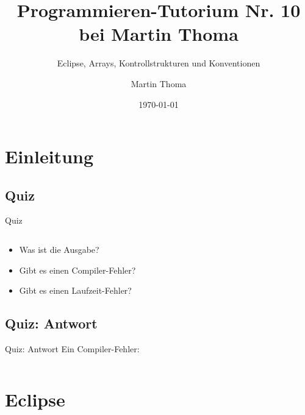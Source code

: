 \documentclass[usepdftitle=false,hyperref={pdfpagelabels=false}]{beamer}
\institute{Fakultät für Informatik}
\newcommand\tutor{Martin Thoma}
\newcommand\tutNR{10}
\newcommand\titleText{Programmieren-Tutorium Nr. \tutNR{} bei \tutor}
\newcommand\InsertToC[1][]{
  \begin{frame}{Outline}
    \tableofcontents[subsectionstyle=show/show/show, subsubsectionstyle=show/show/show, #1]
  \end{frame}
}
\begin{document}
\title{\titleText}
\subtitle{Eclipse, Arrays, Kontrollstrukturen und Konventionen}
\author{\tutor}
\date{\today}
\subject{Programmieren}

\frame{\titlepage}



\section{Einleitung}
\subsection{Quiz}
\begin{frame}{Quiz}
    \inputminted[linenos=true, numbersep=5pt, tabsize=4, fontsize=\small]{java}{Quiz.java}
    \begin{itemize}
        \item Was ist die Ausgabe?
        \item Gibt es einen Compiler-Fehler?
        \item Gibt es einen Laufzeit-Fehler?
    \end{itemize}
\end{frame}

\subsection{Quiz: Antwort}
\begin{frame}{Quiz: Antwort}
    Ein Compiler-Fehler:
    \inputminted[linenos=true, numbersep=5pt, tabsize=4, fontsize=\small]{console}{Quiz-Answer.sh-session}
\end{frame}



\section{Eclipse}
\end{document}
